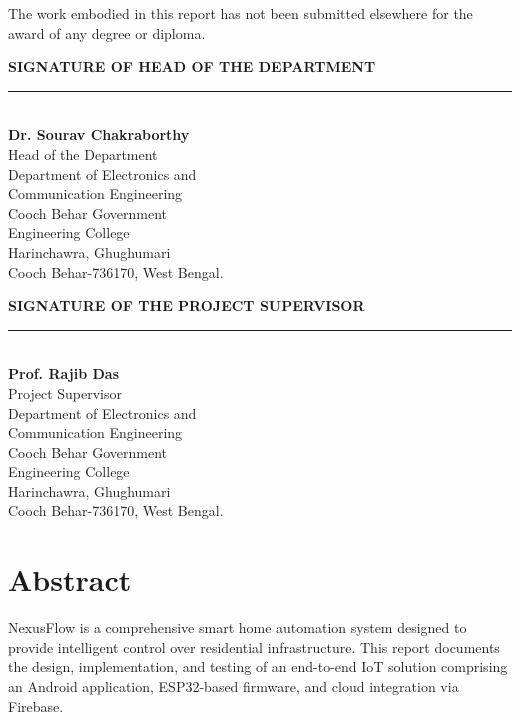 \documentclass[12pt,a4paper,oneside]{report}
\begin{document}
The work embodied in this report has not been submitted elsewhere for the award of any degree or diploma.

\vspace{3cm}

\noindent
\begin{minipage}[t]{0.45\textwidth}
    \centering
    \textbf{SIGNATURE OF HEAD OF THE DEPARTMENT} \\[1.2cm]
    \rule{6.2cm}{0.4pt} \\
    \textbf{Dr. Sourav Chakraborthy} \\
    Head of the Department \\
    Department of Electronics and \\
    Communication Engineering \\
    Cooch Behar Government \\
    Engineering College \\
    Harinchawra, Ghughumari \\
    Cooch Behar-736170, West Bengal.
\end{minipage}
\hfill
\begin{minipage}[t]{0.48\textwidth}
    \centering
    \textbf{SIGNATURE OF THE PROJECT SUPERVISOR} \\[1.2cm]
    \rule{6.2cm}{0.4pt} \\
    \textbf{Prof. Rajib Das} \\
    Project Supervisor \\
    Department of Electronics and \\
    Communication Engineering \\
    Cooch Behar Government \\
    Engineering College \\
    Harinchawra, Ghughumari \\
    Cooch Behar-736170, West Bengal.
\end{minipage}

\chapter*{Abstract}

NexusFlow is a comprehensive smart home automation system designed to provide intelligent control over residential infrastructure. This report documents the design, implementation, and testing of an end-to-end IoT solution comprising an Android application, ESP32-based firmware, and cloud integration via Firebase.
\end{document}
